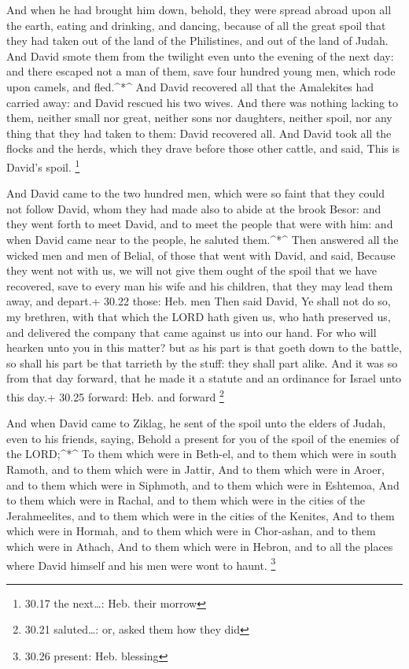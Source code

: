  And when he had brought him down, behold, they were spread
abroad upon all the earth, eating and drinking, and dancing, because of
all the great spoil that they had taken out of the land of the
Philistines, and out of the land of Judah.  And David smote
them from the twilight even unto the evening of the next day: and there
escaped not a man of them, save four hundred young men, which rode upon
camels, and fled.\^{}*\^{}  And David recovered all that
the Amalekites had carried away: and David rescued his two wives.
 And there was nothing lacking to them, neither small nor
great, neither sons nor daughters, neither spoil, nor any thing that
they had taken to them: David recovered all.  And David
took all the flocks and the herds, which they drave before those other
cattle, and said, This is David's spoil. \footnote{30.17 the next\ldots:
  Heb. their morrow}

 And David came to the two hundred men, which were so faint
that they could not follow David, whom they had made also to abide at
the brook Besor: and they went forth to meet David, and to meet the
people that were with him: and when David came near to the people, he
saluted them.\^{}*\^{}  Then answered all the wicked men
and men of Belial, of those that went with David, and said, Because they
went not with us, we will not give them ought of the spoil that we have
recovered, save to every man his wife and his children, that they may
lead them away, and depart.+ 30.22 those: Heb. men  Then
said David, Ye shall not do so, my brethren, with that which the LORD
hath given us, who hath preserved us, and delivered the company that
came against us into our hand.  For who will hearken unto
you in this matter? but as his part is that goeth down to the battle, so
shall his part be that tarrieth by the stuff: they shall part alike.
 And it was so from that day forward, that he made it a
statute and an ordinance for Israel unto this day.+ 30.25 forward: Heb.
and forward \footnote{30.21 saluted\ldots: or, asked them how they did}

 And when David came to Ziklag, he sent of the spoil unto
the elders of Judah, even to his friends, saying, Behold a present for
you of the spoil of the enemies of the LORD;\^{}*\^{}  To
them which were in Beth-el, and to them which were in south Ramoth, and
to them which were in Jattir,  And to them which were in
Aroer, and to them which were in Siphmoth, and to them which were in
Eshtemoa,  And to them which were in Rachal, and to them
which were in the cities of the Jerahmeelites, and to them which were in
the cities of the Kenites,  And to them which were in
Hormah, and to them which were in Chor-ashan, and to them which were in
Athach,  And to them which were in Hebron, and to all the
places where David himself and his men were wont to haunt. \footnote{30.26
  present: Heb. blessing}

